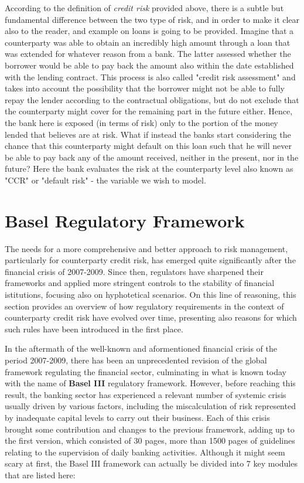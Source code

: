 \documentclass[a4paper,12pt]{article}
\begin{document}
        According to the definition of \textit{credit risk} provided above, there is a subtle but fundamental difference between the two type of risk, and in order to make it clear also to the reader, and example on loans is going
        to be provided. Imagine that a counterparty was able to obtain an incredibly high amount through a loan that was extended for whatever reason from a bank. The latter assessed whether the borrower would be able to 
        pay back the amount also within the date established with the lending contract. This process is also called "credit risk assessment" and takes into account the possibility that the borrower might not be able to fully repay the lender
        according to the contractual obligations, but do not exclude that the counterparty might cover for the remaining part in the future either. Hence, the bank here is exposed (in terms of risk) only to the portion of the money lended that
        believes are at risk. What if instead the banks start considering the chance that this counterparty might default on this loan such that he will never be able to pay back any of the amount received, neither in the present, nor in the future?
        Here the bank evaluates the risk at the counterparty level also known as "CCR" or "default risk" - the variable we wish to model.


    \pagebreak
    \section{Basel Regulatory Framework}

    The needs for a more comprehensive and better approach to risk management, particularly for counterparty credit risk,
    has emerged quite significantly after the financial crisis of 2007-2009. Since then, regulators have sharpened their 
    frameworks and applied more stringent controls to the stability of financial istitutions, focusing also on hyphotetical 
    scenarios. On this line of reasoning, this section provides an overview of how regulatory requirements in the context of counterparty credit
    risk have evolved over time, presenting also reasons for which such rules have been introduced in the first place.

    In the aftermath of the well-known and aformentioned financial crisis of the period 2007-2009, there has been an unprecedented
    revision of the global framework regulating the financial sector, culminating in what is known today with the name of \textbf{Basel III} regulatory framework.
    However, before reaching this result, the banking sector has experienced a relevant number of systemic crisis usually driven by various factors,
    including the miscalculation of risk represented by inadequate capital levels to carry out their business. Each of this crisis brought some contribution 
    and changes to the previous framework, adding up to the first version, which consisted of 30 pages, more than 1500 pages of guidelines relating to the 
    supervision of daily banking activities. Although it might seem scary at first, the Basel III framework can actually be divided into 7 key modules that are
    listed here:
\end{document}
